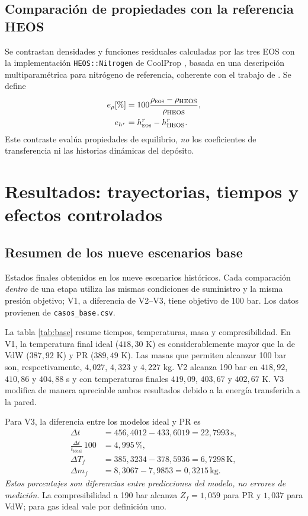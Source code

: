 \documentclass[11pt,letterpaper]{article}
\newcommand{\EOS}{\textsc{eos}}
\newcommand{\tabfile}[3]{\begin{table}[!t]\centering\small\begin{adjustbox}{max width=\textwidth}\end{adjustbox}\caption{#2}\label{#3}\end{table}}
\begin{document}
\subsection{Comparación de propiedades con la referencia HEOS}
Se contrastan densidades y funciones residuales calculadas por las tres EOS con la implementación \texttt{HEOS::Nitrogen} de CoolProp \citep{Bell2014}, basada en una descripción multiparamétrica para nitrógeno de referencia, coherente con el trabajo de \citet{Span2000}. Se define
\begin{align}
e_\rho[\%]&=100\frac{\rho_{\EOS}-\rho_{\mathrm{HEOS}}}{\rho_{\mathrm{HEOS}}},\\
e_{h^r}&=h_{\EOS}^r-h_{\mathrm{HEOS}}^r.\label{eq:errho}
\end{align}
Este contraste evalúa propiedades de equilibrio, \emph{no} los coeficientes de transferencia ni las historias dinámicas del depósito.

\section{Resultados: trayectorias, tiempos y efectos controlados}
\subsection{Resumen de los nueve escenarios base}
\tabfile{base}{Estados finales obtenidos en los nueve escenarios históricos. Cada comparación \emph{dentro} de una etapa utiliza las mismas condiciones de suministro y la misma presión objetivo; V1, a diferencia de V2--V3, tiene objetivo de 100 bar. Los datos provienen de \texttt{casos\_base.csv}.}{tab:base}

La tabla \ref{tab:base} resume tiempos, temperaturas, masa y compresibilidad. En V1, la temperatura final ideal ($418,30$ K) es considerablemente mayor que la de VdW ($387,92$ K) y PR ($389,49$ K). Las masas que permiten alcanzar 100 bar son, respectivamente, $4,027$, $4,323$ y $4,227$ kg. V2 alcanza 190 bar en $418,92$, $410,86$ y $404,88$ s y con temperaturas finales $419,09$, $403,67$ y $402,67$ K. V3 modifica de manera apreciable ambos resultados debido a la energía transferida a la pared.

Para V3, la diferencia entre los modelos ideal y PR es
\begin{align}
\Delta t&=456,4012-433,6019=22,7993\,\mathrm{s},\\
\frac{\Delta t}{t_{\mathrm{ideal}}}\,100&=4,995\,\%,\\
\Delta T_f&=385,3234-378,5936=6,7298\,\mathrm{K},\\
\Delta m_f&=8,3067-7,9853=0,3215\,\mathrm{kg}.\label{eq:delta}
\end{align}
\emph{Estos porcentajes son diferencias entre predicciones del modelo, no errores de medición}. La compresibilidad a 190 bar alcanza $Z_f=1,059$ para PR y $1,037$ para VdW; para gas ideal vale por definición uno.
\end{document}
